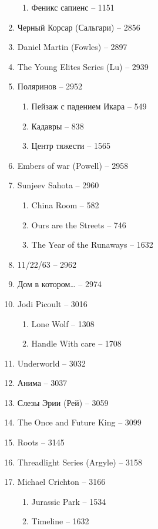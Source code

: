 \documentclass[a4paper, 11pt]{proc} %
\begin{document}
\begin{enumerate}
\begin{enumerate}
            \item Феникс сапиенс -- 1151
        \end{enumerate}
    \item Черный Корсар (Сальгари) -- 2856
    \item Daniel Martin (Fowles) -- 2897
    \item The Young Elites Series (Lu) -- 2939
    \item Поляринов -- 2952
        \begin{enumerate}
            \item Пейзаж с падением Икара -- 549
            \item Кадавры -- 838
            \item Центр тяжести -- 1565
        \end{enumerate}
    \item Embers of war (Powell) -- 2958
    \item Sunjeev Sahota -- 2960
        \begin{enumerate}
            \item China Room -- 582
            \item Ours are the Streets -- 746
            \item The Year of the Runaways -- 1632
        \end{enumerate}
    \item 11/22/63 -- 2962
    \item Дом в котором… -- 2974
    \item Jodi Picoult -- 3016
        \begin{enumerate}
            \item Lone Wolf -- 1308
            \item Handle With care -- 1708
        \end{enumerate}
    \item Underworld -- 3032
    \item Анима -- 3037
    \item Слезы Эрии (Рей) -- 3059
    \item The Once and Future King -- 3099
    \item Roots -- 3145
    \item Threadlight Series (Argyle) -- 3158
    \item Michael Crichton -- 3166
        \begin{enumerate}
            \item Jurassic Park -- 1534
            \item Timeline -- 1632

\end{enumerate}
\end{enumerate}
\end{document}
